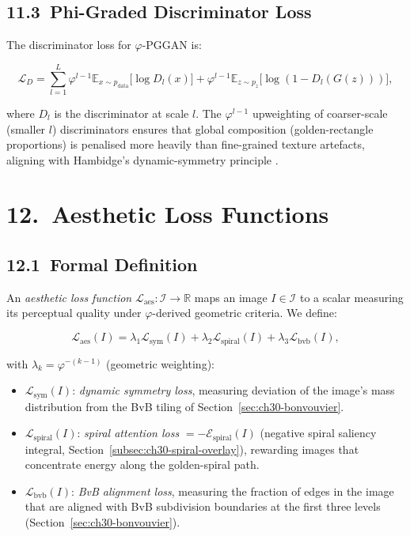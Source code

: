 \subsection{11.3\ Phi-Graded Discriminator
  Loss}\label{subsec:ch30-phi-disc}

The discriminator loss for $\varphi$-PGGAN is:

\[\mathcal{L}_D = \sum_{l=1}^{L}
  \varphi^{l-1}
  \mathbb{E}_{x \sim p_{\text{data}}}
  \bigl[\log D_l(x)\bigr]
  + \varphi^{l-1}
  \mathbb{E}_{z \sim p_z}
  \bigl[\log(1 - D_l(G(z)))\bigr],\]

where $D_l$ is the discriminator at scale $l$.
The $\varphi^{l-1}$ upweighting of
coarser-scale (smaller $l$) discriminators
ensures that global composition (golden-rectangle
proportions) is penalised more heavily than
fine-grained texture artefacts, aligning with
Hambidge's dynamic-symmetry principle
\cite{hambidge_dynamic_symmetry}.

\section{12.\ Aesthetic Loss Functions}%
  \label{sec:ch30-aesthetic-loss}

\subsection{12.1\ Formal
  Definition}\label{subsec:ch30-aesthetic-def}

An \emph{aesthetic loss function}
$\mathcal{L}_{\text{aes}} : \mathcal{I} \to \mathbb{R}$
maps an image $I \in \mathcal{I}$ to a scalar
measuring its perceptual quality under
$\varphi$-derived geometric criteria.  We define:

\[\mathcal{L}_{\text{aes}}(I)
  = \lambda_1 \mathcal{L}_{\text{sym}}(I)
  + \lambda_2 \mathcal{L}_{\text{spiral}}(I)
  + \lambda_3 \mathcal{L}_{\text{bvb}}(I),\]

with $\lambda_k = \varphi^{-(k-1)}$ (geometric
weighting):

\begin{itemize}
  \item $\mathcal{L}_{\text{sym}}(I)$:
    \emph{dynamic symmetry loss}, measuring
    deviation of the image's mass distribution
    from the BvB tiling of
    Section~\ref{sec:ch30-bonvouvier}.
  \item $\mathcal{L}_{\text{spiral}}(I)$:
    \emph{spiral attention loss}
    $= -\mathcal{E}_{\text{spiral}}(I)$
    (negative spiral saliency integral,
    Section~\ref{subsec:ch30-spiral-overlay}),
    rewarding images that concentrate energy
    along the golden-spiral path.
  \item $\mathcal{L}_{\text{bvb}}(I)$:
    \emph{BvB alignment loss}, measuring the
    fraction of edges in the image that are
    aligned with BvB subdivision boundaries
    at the first three levels
    (Section~\ref{sec:ch30-bonvouvier}).
\end{itemize}


